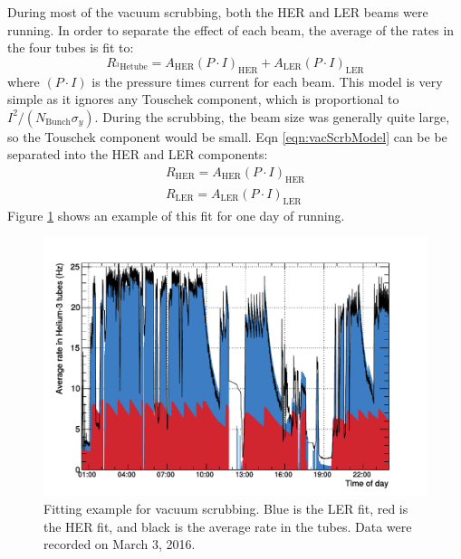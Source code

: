 	During most of the vacuum scrubbing, both the HER and LER beams were running. In order to separate the effect of each beam, the average of the rates in the four \he tubes is fit to:
\begin{equation}
	{R_{^{3}\mathrm{He tube}} = A_{\mathrm{HER}} (P\cdot I)_{\mathrm{HER}}+A_{\mathrm{LER}} (P\cdot I)_{\mathrm{LER}}}
	\label{eqn:vacScrbModel}
\end{equation}
where $(P\cdot I)$ is the pressure times current for each beam. This model is very simple as it ignores any Touschek component, which is proportional to $I^2/(N_{\mathrm{Bunch}}\sigma_{y})$. During the scrubbing, the beam size was generally quite large, so the Touschek component would be small. Eqn \ref{eqn:vacScrbModel} can be be separated into the HER and LER components:
\begin{subequations}
\begin{align}
		{R_{\mathrm{HER}} = A_{\mathrm{HER}} (P\cdot I)_{\mathrm{HER}}} \\
		{R_{\mathrm{LER}} = A_{\mathrm{LER}} (P\cdot I)_{\mathrm{LER}}}
\end{align}
\end{subequations}
Figure \ref{fig:VacScrbExample} shows an example of this fit for one day of running.

\begin{figure}
	\centerfloat
		\includegraphics[trim={0 0 0 0.7cm},clip, width=\textwidth]{images/VacuumScrubFitExample}
	\caption[Fitting example for vacuum scrubbing]{Fitting example for vacuum scrubbing. Blue is the LER fit, red is the HER fit, and black is the average rate in the \he tubes. Data were recorded on March 3, 2016.}	
	\label{fig:VacScrbExample}
\end{figure}


